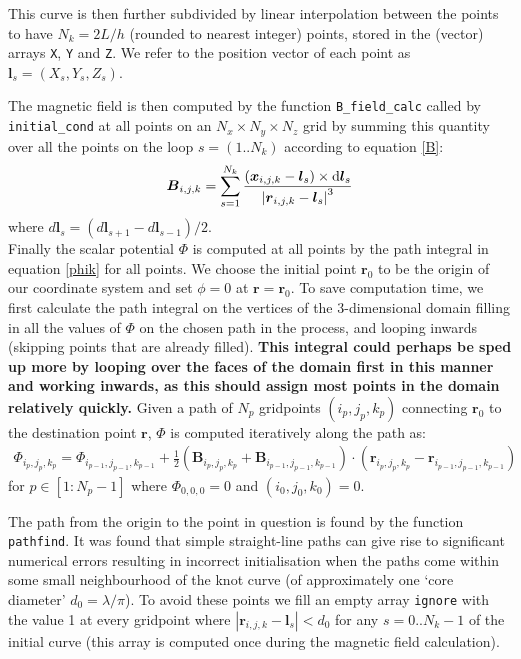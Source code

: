 \documentclass[notitlepage,aps,amsmath,amssymb,11pt]{revtex4-1}
\newcommand{\norm}[1]{\left| #1 \right|}
\renewcommand{\vec}[1]{\boldsymbol{#1}}
\begin{document}
This curve is then further subdivided by linear interpolation between the points to have $N_k =  2 L / h $ (rounded to nearest integer) points, stored in the (vector) arrays \verb'X', \verb'Y' and \verb'Z'. We refer to the position vector of each point as $\vec{l}_s = (X_s, Y_s, Z_s)$. 

The magnetic field is then computed by the function \verb'B_field_calc' called by \verb'initial_cond' at all points on an $N_x \times N_y \times N_z$ grid by summing this quantity over all the points on the loop $s=(1..N_k)$ according to equation \eqref{B}:
\begin{align}
\vec{B}_{i,j,k} = \sum_{s=1}^{N_k} \frac{(\vec{x}_{i,j,k}-\vec{l}_s) \times {\rm d}\vec{l}_s}{\norm{\vec{r}_{i,j,k}-\vec{l}_s}^3}
\end{align}
where $d \vec{l}_s = (d \vec{l}_{s+1} - d \vec{l}_{s-1})/2$. \\

Finally the scalar potential $\Phi$ is computed at all points by the path integral in equation \eqref{phik} for all points. We choose the initial point $\vec{r}_0$ to be the origin of our coordinate system and set $\phi=0$ at $\vec{r}=\vec{r}_0$. To save computation time, we first calculate the path integral on the vertices of the 3-dimensional domain filling in all the values of $\Phi$ on the chosen path in the process, and looping inwards (skipping points that are already filled). {\bf This integral could perhaps be sped up more by looping over the faces of the domain first in this manner and working inwards, as this should assign most points in the domain relatively quickly.} Given a path of $N_p$ gridpoints $(i_p, j_p, k_p)$ connecting $\vec{r}_0$ to the destination point $\vec{r}$, $\Phi$ is computed iteratively along the path as:
\begin{align}
\Phi_{i_p,j_p,k_p} = \Phi_{i_{p-1},j_{p-1},k_{p-1}}  + \frac{1}{2}(\vec{B}_{i_p,j_p,k_p} + \vec{B}_{i_{p-1},j_{p-1},k_{p-1}})\cdot(\vec{r}_{i_p,j_p,k_p} - \vec{r}_{i_{p-1},j_{p-1},k_{p-1}}) 
\end{align}
for $p \in [1:N_p-1]$ where $\Phi_{0,0,0}=0$ and $(i_0,j_0,k_0) = 0$.

The path from the origin to the point in question is found by the function \verb'pathfind'. It was found that simple straight-line paths can give rise to significant numerical errors resulting in incorrect initialisation when the paths come within some small neighbourhood of the knot curve (of approximately one `core diameter' $d_0 = \lambda/\pi$). To avoid these points we fill an empty array \verb'ignore' with the value 1 at every gridpoint where $\norm{\vec{r}_{i,j,k}-\vec{l}_s} < d_0$ for any $s=0..N_k-1$ of the initial curve (this array is computed once during the magnetic field calculation). 
\end{document}
